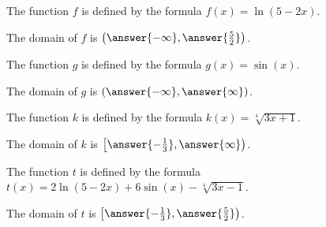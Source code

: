 \documentclass{ximera}
\author{Bobby Ramsey}
\begin{document}
\begin{exercise} 
	The function $f$ is defined by the formula $f(x)=\ln(5-2x)$.
	\begin{center}
		The domain of $f$ is $\left(\answer{-\infty},\answer{\frac{5}{2}}\right)$.
	\end{center}
\end{exercise}

\begin{exercise} 
	The function $g$ is defined by the formula $g(x)=\sin(x)$.
	\begin{center}
		The domain of $g$ is $\left(\answer{-\infty}, \answer{\infty}\right)$.
	\end{center}
\end{exercise}

\begin{exercise} 
	The function $k$ is defined by the formula $k(x)=\sqrt[4]{3x+1}$.
	\begin{center}
		The domain of $k$ is $\left[\answer{-\frac{1}{3}}, \answer{\infty}\right)$.
	\end{center}
\end{exercise}

\begin{exercise} 
	The function $t$ is defined by the formula $t(x)=2\ln(5-2x)+6\sin(x)-\sqrt[4]{3x-1}$.
	\begin{center}
		The domain of $t$ is $\left[\answer{-\frac{1}{3}}, \answer{\frac{5}{2}}\right)$.
	\end{center}
\end{exercise}
\end{document}

